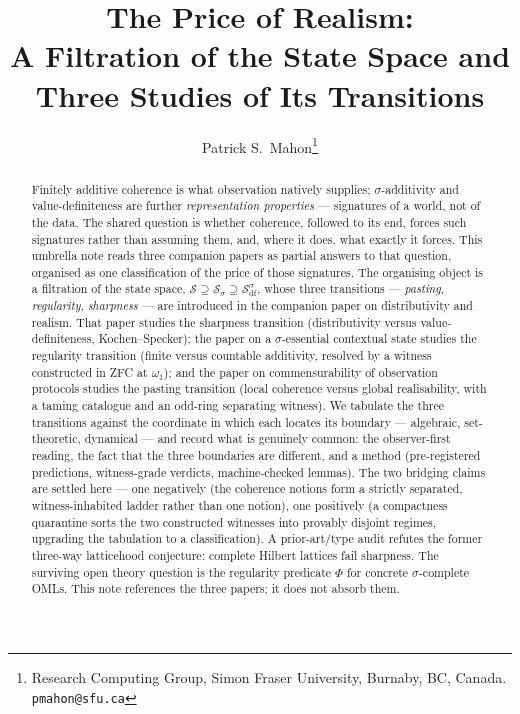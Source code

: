 \documentclass[11pt]{article}
\title{The Price of Realism:\\
A Filtration of the State Space and Three Studies of Its Transitions}
\author{Patrick S.\ Mahon\thanks{%
  Research Computing Group, Simon Fraser University, Burnaby, BC, Canada.
  \texttt{pmahon@sfu.ca}}}
\date{}
\theoremstyle{definition}
\newcommand{\Sf}{\mathcal{S}}
\newcommand{\Ssig}{\mathcal{S}_\sigma}
\newcommand{\Sdfsig}{\mathcal{S}_{\mathrm{df}}^\sigma}
\newif\ifstandalone
\begin{document}
\maketitle

\begin{abstract}
Finitely additive coherence is what observation natively supplies;
$\sigma$-additivity and value-definiteness are further \emph{representation
properties} --- signatures of a world, not of the data. The shared question is
whether coherence, followed to its end, forces such signatures rather than
assuming them, and, where it does, what exactly it forces. This umbrella note reads
three companion papers as partial answers to that question, organised as one
classification of the price of those signatures.
The organising object is a filtration of the state space,
$\Sf \supseteq \Ssig \supseteq \Sdfsig$, whose three transitions --- \emph{pasting},
\emph{regularity}, \emph{sharpness} --- are introduced in the companion paper on
distributivity and realism. That paper studies the sharpness transition
(distributivity versus value-definiteness, Kochen--Specker); the paper on a
$\sigma$-essential contextual state studies the regularity transition (finite
versus countable additivity, resolved by a witness constructed in ZFC at
$\omega_1$); and the paper on commensurability of observation protocols studies
the pasting transition (local coherence versus global realisability, with a
taming catalogue and an odd-ring separating witness). We tabulate the three
transitions against the coordinate in which each locates its boundary ---
algebraic, set-theoretic, dynamical --- and record what is genuinely common: the
observer-first reading, the fact that the three boundaries are different, and a
method (pre-registered predictions, witness-grade verdicts, machine-checked
lemmas). The two bridging claims are settled here ---
one negatively (the coherence notions form a strictly separated, witness-inhabited
ladder rather than one notion), one positively (a compactness quarantine sorts the
two constructed witnesses into provably disjoint regimes, upgrading the tabulation
to a classification). A prior-art/type audit refutes the former three-way
latticehood conjecture: complete Hilbert lattices fail sharpness. The surviving
open theory question is the regularity predicate $\Phi$ for concrete
$\sigma$-complete OMLs. This note references the three papers; it does not absorb
them.
\end{abstract}

\ifstandalone



\fi
\end{document}
